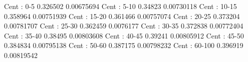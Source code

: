 Cent : 0-5
0.326502 0.00675694
Cent : 5-10
0.34823 0.00730118
Cent : 10-15
0.358964 0.00751939
Cent : 15-20
0.361466 0.00757074
Cent : 20-25
0.373204 0.00781707
Cent : 25-30
0.362459 0.0076177
Cent : 30-35
0.372838 0.00772404
Cent : 35-40
0.38495 0.00803608
Cent : 40-45
0.39241 0.00805912
Cent : 45-50
0.384834 0.00795138
Cent : 50-60
0.387175 0.00798232
Cent : 60-100
0.396919 0.00819542
